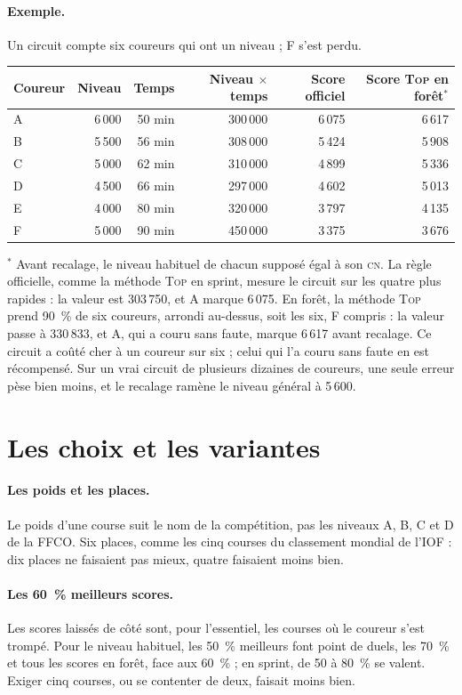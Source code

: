 \documentclass[11pt,a4paper]{article}
\newcommand{\Top}{\textsc{Top}}
\newcommand{\CN}{\textsc{cn}}
\begin{document}
\paragraph{Exemple.} Un circuit compte six coureurs qui ont un niveau ; F s'est perdu.
\begin{center}\small
\begin{tabular}{@{}lrrrrr@{}}\toprule
Coureur & Niveau & Temps & Niveau $\times$ temps & Score officiel & Score \Top{} en forêt$^*$ \\ \midrule
A & 6\,000 & 50 min & 300\,000 & 6\,075 & 6\,617 \\
B & 5\,500 & 56 min & 308\,000 & 5\,424 & 5\,908 \\
C & 5\,000 & 62 min & 310\,000 & 4\,899 & 5\,336 \\
D & 4\,500 & 66 min & 297\,000 & 4\,602 & 5\,013 \\
E & 4\,000 & 80 min & 320\,000 & 3\,797 & 4\,135 \\
F & 5\,000 & 90 min & 450\,000 & 3\,375 & 3\,676 \\ \bottomrule
\end{tabular}
\end{center}
$^*$ Avant recalage, le niveau habituel de chacun supposé égal à son \CN. La règle officielle, comme la méthode \Top{} en sprint, mesure le circuit sur les quatre plus rapides : la valeur est 303\,750, et A marque 6\,075. En forêt, la méthode \Top{} prend 90~\% de six coureurs, arrondi au-dessus, soit les six, F compris : la valeur passe à 330\,833, et A, qui a couru sans faute, marque 6\,617 avant recalage. Ce circuit a coûté cher à un coureur sur six ; celui qui l'a couru sans faute en est récompensé. Sur un vrai circuit de plusieurs dizaines de coureurs, une seule erreur pèse bien moins, et le recalage ramène le niveau général à 5\,600.

\section{Les choix et les variantes}

\paragraph{Les poids et les places.} Le poids d'une course suit le nom de la compétition, pas les niveaux A, B, C et D de la FFCO. Six places, comme les cinq courses du classement mondial de l'IOF : dix places ne faisaient pas mieux, quatre faisaient moins bien.

\paragraph{Les 60~\% meilleurs scores.} Les scores laissés de côté sont, pour l'essentiel, les courses où le coureur s'est trompé. Pour le niveau habituel, les 50~\% meilleurs font \NeligFifty{} point de duels, les 70~\% \NeligSeventy{} et tous les scores \NeligAll{} en forêt, face aux 60~\% ; en sprint, de 50 à 80~\% se valent. Exiger cinq courses, ou se contenter de deux, faisait moins bien.
\end{document}
